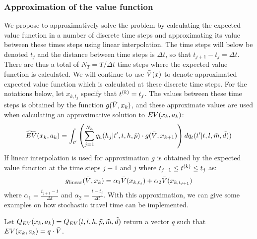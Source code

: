 \subsubsection{Approximation of the value function}
We propose to approximatively solve the problem by calculating the expected value function in a number of discrete time steps and approximating its value between these times steps using linear interpolation. The time steps will below be denoted $t_j$ and the distance between time steps is $\Delta t$, so that $t_{j+1}-t_j = \Delta t$. There are thus a total of $N_T = T/\Delta t$ time steps where the expected value function is calculated. We will continue to use $\bar{V}(x)$ to denote approximated expected value function which is calculated at these discrete time steps. For the notations below, let $x_{k,t_j}$ specify that $t^{(k)} = t_j$. The values between these time steps is obtained by the function $g(\bar{V},x_k)$, and these approximate values are used when calculating an approximative solution to $EV(x_k,a_k)$: 
\begin{equation} \label{eq:eutilapprox}
\begin{aligned}
\aeutil(x_k,a_k)=
\int_{t'} \left( \sum_{j=1}^{N_{\amem}}q_\amem(\amem_j|t', t,\amem,\act{p}) \cdot g(\ev,x_{k+1}) \right)dq_t(t'|t,l,\act{m},\act{d}))
\end{aligned}
\end{equation}
If linear interpolation is used for approximation $g$ is obtained by the expected value function at the time steps $j-1$ and $j$ where $t_{j-1} \leq t^{(k)} \leq t_j $ as: 
\begin{equation}\label{eq:linap2}
g_\text{linear}(\ev,x_k) = \alpha_1 \ev(x_{k,t_j}) + \alpha_2 \ev(x_{k,t_{j+1}})
\end{equation}
where $\alpha_1 = \frac{t_{j+1}-t}{\Delta t}$ and $\alpha_2 = \frac{t-t_j}{\Delta t}$.
With this approximation, we can give some examples on how stochastic travel time can be implemented.

Let $Q_{EV}(x_k,a_k)=Q_{EV}(t,l,h,\tilde{p},\tilde{m},\tilde{d})$ return a vector $q$ such that $EV(x_k,a_k) =  q \cdot \bar{V}$. 

